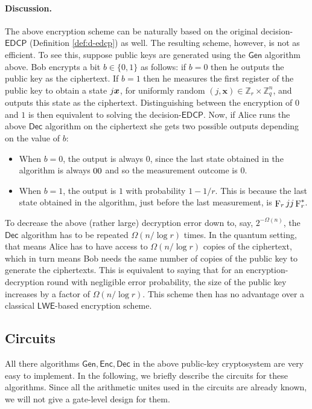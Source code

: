 \documentclass[11pt]{article}
\theoremstyle{plain}
\theoremstyle{definition}
\DeclareMathOperator{\qft}{F}
\let\ket\relax
\DeclarePairedDelimiter{\ket}{\lvert}{\rangle}
\let\bra\relax
\DeclarePairedDelimiter{\bra}{\langle}{\rvert}
\def\Z{\mathbb{Z}}
\def\lwe{\mathsf{LWE}}
\def\edcp{\mathsf{EDCP}}
\def\gen{\mathsf{Gen}}
\def\enc{\mathsf{Enc}}
\def\dec{\mathsf{Dec}}
\begin{document}
\paragraph{Discussion.}
The above encryption scheme can be naturally based on the original decision-$\edcp$ (Definition \ref{def:d-edcp}) as well. The resulting scheme, however, is not as efficient. To see this, suppose public keys are generated using the $\gen$ algorithm above. Bob encrypts a bit $b \in \{0, 1\}$ as follows: if $b = 0$ then he outputs the public key as the ciphertext. If $b = 1$ then he measures the first register of the public key to obtain a state $\ket{j}\ket{\bm{x}}$, for uniformly random $(j, \bm{x}) \in \Z_r \times \Z_q^n$, and outputs this state as the ciphertext. Distinguishing between the encryption of $0$ and $1$ is then equivalent to solving the decision-$\edcp$. Now, if Alice runs the above $\dec$ algorithm on the ciphertext she gets two possible outputs depending on the value of $b$:
\begin{itemize}
\item When $b = 0$, the output is always $0$, since the last state obtained in the algorithm is always $\ket{0}\bra{0}$ and so the measurement outcome is $0$.
\item When $b = 1$, the output is $1$ with probability $1 - 1 / r$. This is because the last state obtained in the algorithm, just before the last measurement, is $\qft_r \ket{j}\bra{j} \qft_r^*$. 
\end{itemize}
To decrease the above (rather large) decryption error down to, say, $2^{-\Omega(n)}$, the $\dec$ algorithm has to be repeated $\Omega(n / \log r)$ times. In the quantum setting, that means Alice has to have access to $\Omega(n / \log r)$ copies of the ciphertext, which in turn means Bob needs the same number of copies of the public key to generate the ciphertexts. This is equivalent to saying that for an encryption-decryption round with negligible error probability, the size of the public key increases by a factor of $\Omega(n / \log r)$. This scheme then has no advantage over a classical $\lwe$-based encryption scheme.



\subsection{Circuits}

All there algorithms $\gen, \enc, \dec$ in the above public-key cryptosystem are very easy to implement. In the following, we briefly describe the circuits for these algorithms. Since all the arithmetic unites used in the circuits are already known, we will not give a gate-level design for them.
\end{document}
